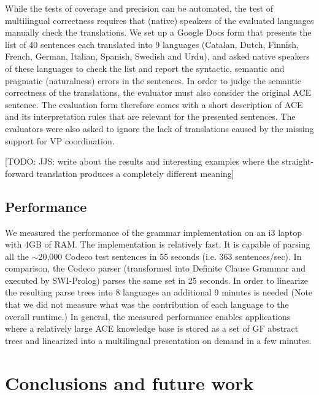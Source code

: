 \documentclass[a4paper]{article}
\begin{document}
While the tests of coverage and precision can be automated, the test of
multilingual correctness requires that (native) speakers of the evaluated
languages manually check the translations. We set up a Google Docs form that
presents the list of 40 sentences each translated into 9 languages
(Catalan, Dutch, Finnish, French, German, Italian, Spanish, Swedish and Urdu),
and asked native speakers of these languages to check the list and report
the syntactic, semantic and pragmatic (naturalness) errors in the sentences.
In order to judge the semantic correctness of the translations, the
evaluator must also consider the original ACE sentence. The evaluation form
therefore comes with a short description of ACE and its interpretation rules
that are relevant for the presented sentences.
The evaluators were also asked to ignore the lack of translations caused by
the missing support for VP coordination.

[TODO: JJS: write about the results and
interesting examples where the straight-forward translation produces
a completely different meaning]


\subsection{Performance}

We measured the performance of the grammar implementation on an i3 laptop
with 4GB of RAM.
The implementation is relatively fast. It is capable of parsing
all the $\sim$20,000 Codeco test sentences in 55 seconds
(i.e. 363 sentences/sec). In comparison, the Codeco parser (transformed into
Definite Clause Grammar and executed by SWI-Prolog) parses
the same set in 25 seconds.
In order to linearize the
resulting parse trees into 8 languages an additional 9 minutes is needed
(Note that we did not measure what was
the contribution of each language to the overall runtime.)
In general,
the measured performance enables applications where a relatively large ACE
knowledge base is stored as a set of GF abstract trees and linearized into a
multilingual presentation on demand in a few minutes.

\section{Conclusions and future work}
\label{section:Conclusions}
\end{document}
